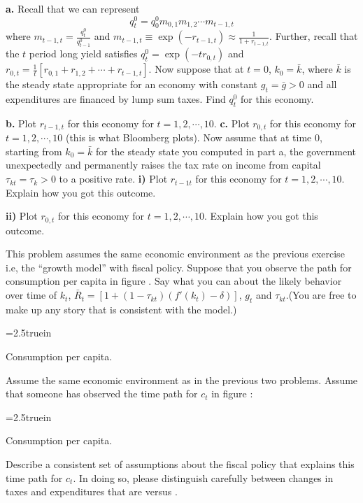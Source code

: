 \medskip

 \noindent
{\bf a.} Recall that we can represent
$$ q_t^0  = q_0^0m_{0,1}m_{1,2}\cdots m_{t-1,t} $$
where $m_{t-1,t}  = {\frac{q_t^0}{q_{t-1}^0}} $ and $ m_{t-1,t} \equiv \exp(-r_{t-1,t})\approx {\frac{1}{1+r_{t-1,t}}}$.
Further, recall that the $t$ period long yield  satisfies
$q_t^0  =\exp(-tr_{0,t}) $
and $
r_{0,t}  = {\frac{1}{t}}[r_{0,1}+r_{1,2}+\cdots+r_{t-1,t}] $.
Now suppose that at $t=0$, $k_0=\bar k$, where $\bar k$ is the steady state appropriate for an economy with constant $g_t=\bar g >0$ and all expenditures are financed by lump sum taxes. Find $q_t^0$ for this economy.

\medskip \noindent
{\bf b.} Plot $r_{t-1,t}$ for this economy for $t=1,2,\cdots,10$.
\medskip \noindent
{\bf c.} Plot $r_{0,t}$ for this economy for $t=1,2,\cdots,10$ (this is what Bloomberg plots).
\medskip
{} Now assume that at time 0, starting from $k_0=\bar k$ for the steady state you computed in part a, the government unexpectedly and permanently raises the tax rate on income from capital $\tau_{kt}=\tau_k >0$ to a positive rate.
\medskip \indent
{\bf i)} Plot $r_{t-1t}$ for this economy for $t=1,2,\cdots,10$. Explain how you got this outcome.

\medskip \indent
{\bf ii)} Plot $r_{0,t}$ for this economy for $t=1,2,\cdots,10$. Explain how you got this outcome.



\medskip
{}
\medskip
\noindent
 This problem assumes the same economic environment as the previous exercise i.e, the ``growth model'' with fiscal policy.
Suppose that you observe the path for consumption per capita in figure . Say what you can about the likely behavior over time of $k_t$, $\bar R_t =[1 + (1-\tau_{kt})(f'(k_t)-\delta)]$, $g_t$ and $\tau_{kt}$.(You are free to make up any story that is consistent with the model.)

\medskip


\centerline{\epsfxsize=2.5truein}
\caption{Consumption per capita.}
\endfigure




\medskip
{}
\medskip
\noindent Assume the same economic environment as in the previous two problems. Assume that someone has observed the  time path for $c_t$ in figure :
\medskip
{}
\centerline{\epsfxsize=2.5truein}
\caption{Consumption per capita.}
\endfigure
\medskip
{} Describe a consistent set of assumptions about the fiscal policy that explains this time path for
$c_t$. In doing so, please distinguish carefully between changes in taxes and expenditures that are  versus .

